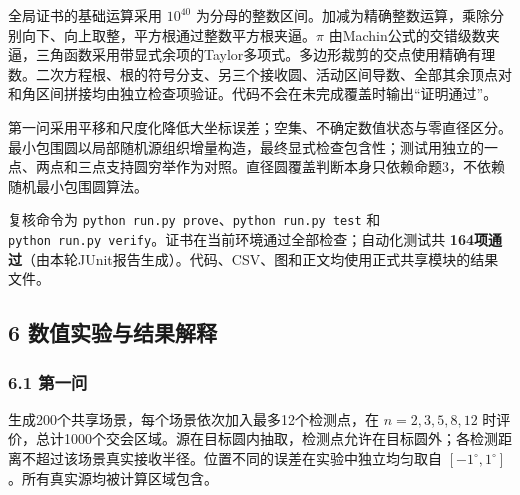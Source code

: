 \documentclass[
  11pt,
  fontset=none]{ctexart}
\begin{document}
全局证书的基础运算采用 \(10^{40}\)
为分母的整数区间。加减为精确整数运算，乘除分别向下、向上取整，平方根通过整数平方根夹逼。\(\pi\)
由Machin公式的交错级数夹逼，三角函数采用带显式余项的Taylor多项式。多边形裁剪的交点使用精确有理数。二次方程根、根的符号分支、另三个接收圆、活动区间导数、全部其余顶点对和角区间拼接均由独立检查项验证。代码不会在未完成覆盖时输出``证明通过''。

第一问采用平移和尺度化降低大坐标误差；空集、不确定数值状态与零直径区分。最小包围圆以局部随机源组织增量构造，最终显式检查包含性；测试用独立的一点、两点和三点支持圆穷举作为对照。直径圆覆盖判断本身只依赖命题3，不依赖随机最小包围圆算法。

复核命令为 \texttt{python\ run.py\ prove}、\texttt{python\ run.py\ test}
和
\texttt{python\ run.py\ verify}。证书在当前环境通过全部检查；自动化测试共
\textbf{164项通过}（由本轮JUnit报告生成）。代码、CSV、图和正文均使用正式共享模块的结果文件。

\subsection{6
数值实验与结果解释}\label{ux6570ux503cux5b9eux9a8cux4e0eux7ed3ux679cux89e3ux91ca}

\subsubsection{6.1 第一问}\label{ux7b2cux4e00ux95ee}

生成200个共享场景，每个场景依次加入最多12个检测点，在 \(n=2,3,5,8,12\)
时评价，总计1000个交会区域。源在目标圆内抽取，检测点允许在目标圆外；各检测距离不超过该场景真实接收半径。位置不同的误差在实验中独立均匀取自
\([-1^\circ,1^\circ]\)。所有真实源均被计算区域包含。
\end{document}
